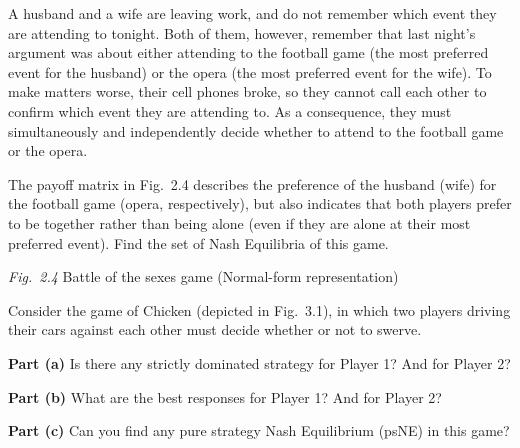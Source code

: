 A husband and a wife are leaving work, and do not remember which event they are attending to
tonight. Both of them, however, remember that last night's argument was about either attending to
the football game (the most preferred event for the husband) or the opera (the most preferred event
for the wife). To make matters worse, their cell phones broke, so they cannot call each other to
confirm which event they are attending to. As a consequence, they must simultaneously and
independently decide whether to attend to the football game or the opera.

The payoff matrix in Fig.~2.4 describes the preference of the husband (wife) for the football game
(opera, respectively), but also indicates that both players prefer to be together rather than being
alone (even if they are alone at their most preferred event). Find the set of Nash Equilibria of
this game.
\vspace{-6pt}\begin{center}\small\textit{Fig.~2.4} Battle of the sexes game (Normal-form
representation)\end{center}
\resolespaco


Consider the game of Chicken (depicted in Fig.~3.1), in which two players driving their cars
against each other must decide whether or not to swerve.

\textbf{Part (a)} Is there any strictly dominated strategy for Player 1? And for Player 2?

\textbf{Part (b)} What are the best responses for Player 1? And for Player 2?

\textbf{Part (c)} Can you find any pure strategy Nash Equilibrium (psNE) in this game?

